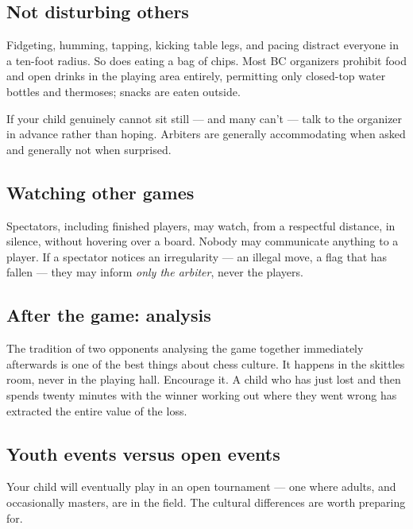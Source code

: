 \documentclass[10pt,letterpaper]{article}
\begin{document}
\subsection{Not disturbing others}

Fidgeting, humming, tapping, kicking table legs, and pacing distract everyone in
a ten-foot radius. So does eating a bag of chips. Most BC organizers prohibit
food and open drinks in the playing area entirely, permitting only closed-top
water bottles and thermoses; snacks are eaten outside.

If your child genuinely cannot sit still --- and many can't --- talk to the
organizer in advance rather than hoping. Arbiters are generally accommodating
when asked and generally not when surprised.

\subsection{Watching other games}

Spectators, including finished players, may watch, from a respectful distance,
in silence, without hovering over a board. Nobody may communicate anything to a
player. If a spectator notices an irregularity --- an illegal move, a flag that
has fallen --- they may inform \emph{only the arbiter}, never the players.

\subsection{After the game: analysis}

The tradition of two opponents analysing the game together immediately
afterwards is one of the best things about chess culture. It happens in the
skittles room, never in the playing hall. Encourage it. A child who has just
lost and then spends twenty minutes with the winner working out where they went
wrong has extracted the entire value of the loss.

\subsection{Youth events versus open events}

Your child will eventually play in an open tournament --- one where adults, and
occasionally masters, are in the field. The cultural differences are worth
preparing for.
\end{document}
